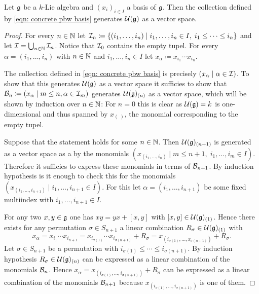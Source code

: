 \begin{lem}
 Let $\mathfrak{g}$ be a $k$-Lie algebra and $(x_i)_{i \in I}$ a basis of $\mathfrak{g}$. Then the collection defined by \eqref{eqn: concrete pbw basis} generates $\mathcal{U}(\mathfrak{g})$ as a vector space.
\end{lem}
\begin{proof}
 For every $n \in \mathbb{N}$ let $\mathcal{I}_n \coloneqq \{(i_1, \dotsc, i_n) \mid i_1, \dotsc, i_n \in I, \; i_1 \leq \dotsb \leq i_n\}$ and let $\mathcal{I} = \bigcup_{n \in \mathbb{N}} \mathcal{I}_n$. Notice that $\mathcal{I}_0$ contains the empty tupel. For every $\alpha = (i_1, \dotsc, i_n)$ with $n \in \mathbb{N}$ and $i_1, \dotsc, i_n \in I$ let $x_\alpha \coloneqq x_{i_1} \dotsm x_{i_n}$.

 The collection defined in \eqref{eqn: concrete pbw basis} is precisely $(x_\alpha \mid \alpha \in \mathcal{I})$. To show that this generates $\mathcal{U}(\mathfrak{g})$ as a vector space it sufficies to show that $\mathcal{B}_n \coloneqq (x_\alpha \mid m \leq n, \alpha \in \mathcal{I}_m)$ generates $\mathcal{U}(\mathfrak{g})_{(n)}$ as a vector space, which will be shown by induction over $n \in \mathbb{N}$: For $n = 0$ this is clear as $\mathcal{U}(\mathfrak{g}) = k$ is one-dimensional and thus spanned by $x_{(\;)}$, the monomial corresponding to the empty tupel.
 
 Suppose that the statement holds for some $n \in \mathbb{N}$. Then $\mathcal{U}(\mathfrak{g})_{(n+1)}$ is generated as a vector space as a by the monomials $(x_{(i_1, \dotsc, i_n)} \mid m \leq n+1, \; i_1, \dotsc, i_m \in I)$. Therefore it sufficies to express these monomials in terms of $\mathcal{B}_{n+1}$. By induction hypothesis is it enough to check this for the monomials $(x_{(i_1, \dotsc, i_{n+1})} \mid i_1, \dotsc, i_{n+1} \in I)$. For this let $\alpha = (i_1, \dotsc, i_{n+1})$ be some fixed multiindex with $i_1, \dotsc, i_{n+1} \in I$.
 
 For any two $x,y \in \mathfrak{g}$ one has $xy = yx + [x,y]$ with $[x,y] \in \mathcal{U}(\mathfrak{g})_{(1)}$. Hence there exists for any permutation $\sigma \in S_{n+1}$ a linear combination $R_\sigma \in \mathcal{U}(\mathfrak{g})_{(1)}$ with
 \[
  x_\alpha
  = x_{i_1} \dotsm x_{i_{n+1}}
  = x_{i_{\sigma(1)}} \dotsm x_{i_{\sigma(n+1)}} + R_\sigma
  = x_{(i_{\sigma(1)}, \dotsc, x_{\sigma(n+1)})} + R_\sigma.
 \]
 Let $\sigma \in S_{n+1}$ be a permutation with $i_{\sigma(1)} \leq \dotsb \leq i_{\sigma(n+1)}$. By induction hypothesis $R_\sigma \in \mathcal{U}(\mathfrak{g})_{(n)}$ can be expressed as a linear combination of the monomials $\mathcal{B}_n$. Hence $x_\alpha = x_{(i_{\sigma(1)}, \dotsc, i_{\sigma(n+1)})} + R_\sigma$ can be expressed as a linear combination of the monomials $\mathcal{B}_{n+1}$ because $x_{(i_{\sigma(1)}, \dotsc, i_{\sigma(n+1)})}$ is one of them.
\end{proof}


